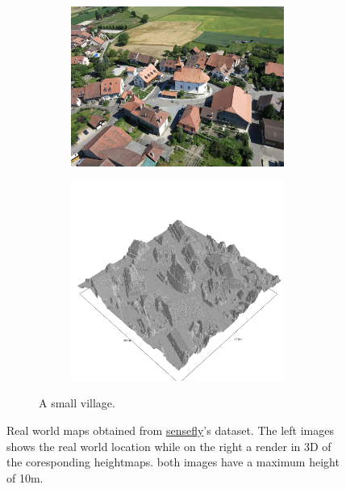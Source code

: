 \documentclass[../document.tex]{subfiles}
\begin{document}
\begin{figure}[htbp]
\begin{subfigure}[b]{1\textwidth}
\begin{subfigure}[b]{0.45\textwidth}
        \includegraphics[width=\textwidth]{../img/sullens-real.jpg}
    \end{subfigure}  
    \begin{subfigure}[b]{0.45\textwidth}
        \includegraphics[width=\textwidth]{../img/hm3d_borders/sullens.png}
    \end{subfigure} 
    \caption{A small village.} 
\end{subfigure}
\caption{Real world maps obtained from \href{https://www.sensefly.com/education/datasets/}{sensefly}'s dataset. The left images shows the real world location while on the right a render in 3D of the coresponding heightmaps. both images have a maximum height of 10m.}  
\label{fig : real-maps}
\end{figure}
\end{document}

